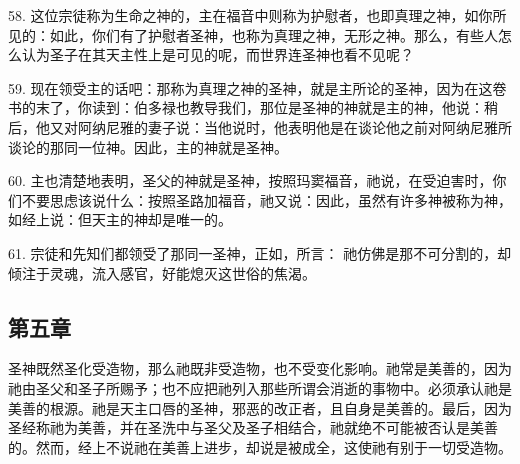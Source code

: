 58. 这位宗徒称为生命之神的，主在福音中则称为护慰者，也即真理之神，如你所见的：如此，你们有了护慰者圣神，也称为真理之神，无形之神。那么，有些人怎么认为圣子在其天主性上是可见的呢，而世界连圣神也看不见呢？\par

59. 现在领受主的话吧：那称为真理之神的圣神，就是主所论的圣神，因为在这卷书的末了，你读到：伯多禄也教导我们，那位是圣神的神就是主的神，他说：稍后，他又对阿纳尼雅的妻子说：当他说时，他表明他是在谈论他之前对阿纳尼雅所谈论的那同一位神。因此，主的神就是圣神。\par

60. 主也清楚地表明，圣父的神就是圣神，按照玛窦福音，祂说，在受迫害时，你们不要思虑该说什么：按照圣路加福音，祂又说：因此，虽然有许多神被称为神，如经上说：但天主的神却是唯一的。\par

61. 宗徒和先知们都领受了那同一圣神，正如，所言： 祂仿佛是那不可分割的，却倾注于灵魂，流入感官，好能熄灭这世俗的焦渴。\par


\subsection{第五章}

圣神既然圣化受造物，那么祂既非受造物，也不受变化影响。祂常是美善的，因为祂由圣父和圣子所赐予；也不应把祂列入那些所谓会消逝的事物中。必须承认祂是美善的根源。祂是天主口唇的圣神，邪恶的改正者，且自身是美善的。最后，因为圣经称祂为美善，并在圣洗中与圣父及圣子相结合，祂就绝不可能被否认是美善的。然而，经上不说祂在美善上进步，却说是被成全，这使祂有别于一切受造物。\par

